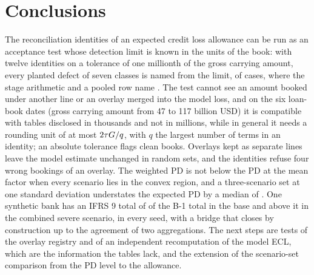 \section{Conclusions}
\label{sec:conclusions}

The reconciliation identities of an expected credit loss allowance can be run as an acceptance test whose detection limit is known in the units of the book: with twelve identities on a tolerance of one millionth of the gross carrying amount, every planted defect of seven classes is named from the limit, \eoneAboveFullK{} of \eoneAboveFullN{} cases, where the stage arithmetic and a pooled row name \eoneAboveStageK{}.
The test cannot see an amount booked under another line or an overlay merged into the model loss, and on the six loan-book dates (gross carrying amount from 47 to 117 billion USD) it is compatible with tables disclosed in thousands and not in millions, while in general it needs a rounding unit of at most $2\tau G/q$, with $q$ the largest number of terms in an identity; an absolute tolerance flags clean books.
Overlays kept as separate lines leave the model estimate unchanged in \ethreeSets{} random sets, and the identities refuse four wrong bookings of an overlay.
The weighted PD is not below the PD at the mean factor when every scenario lies in the convex region, and a three-scenario set at one standard deviation understates the expected PD by a median of \efourAdhocMed{}.
One synthetic bank has an IFRS 9 total of \efiveBaseMean{} of the B-1 total in the base and above it in the combined severe scenario, in every seed, with a bridge that closes by construction up to the agreement of two aggregations.
The next steps are tests of the overlay registry and of an independent recomputation of the model ECL, which are the information the tables lack, and the extension of the scenario-set comparison from the PD level to the allowance.
